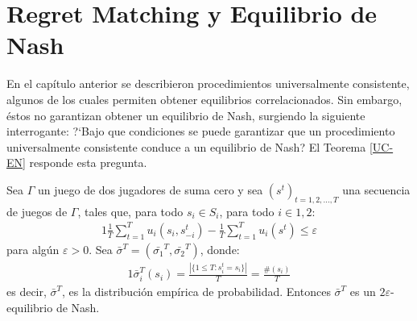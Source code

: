 \section{Regret Matching y Equilibrio de Nash}
En el capítulo anterior se describieron procedimientos universalmente consistente, algunos de los cuales permiten obtener equilibrios correlacionados. Sin embargo, éstos no garantizan obtener un equilibrio de Nash, surgiendo la siguiente interrogante: ?`Bajo que condiciones se puede garantizar que un procedimiento universalmente consistente conduce a un equilibrio de Nash? El Teorema \ref{UC-EN} responde esta pregunta.

\begin{theorem}
\label{UC-EN}
Sea $\Gamma$ un juego de dos jugadores de suma cero y sea $(s^t)_{t=1,2,..., T}$ una secuencia de juegos de $\Gamma$, tales que, para todo $s_i \in S_i$, para todo $i \in {1, 2}$:
\begin{alignat}{1}
\frac{1}{T}\sum_{t = 1}^{T}u_i(s_i, s_{-i}^t) - \frac{1}{T} \sum_{t = 1}^T u_i(s^t) \leq \varepsilon
\end{alignat}
para algún $\varepsilon > 0$. Sea $\bar{\sigma}^T = (\bar{\sigma_1}^T, \bar{\sigma_2}^T)$, donde:
\begin{alignat}{1}
\bar{\sigma}_i^T(s_i) = \frac{ |\{ 1 \leq T : s_i^t = s_i\}|}{T} = \frac{\#(s_i)}{T}
\end{alignat}
es decir, $\bar{\sigma}^T$, es la distribución empírica de probabilidad. Entonces $\bar{\sigma}^T$ es un $2\varepsilon$-equilibrio de Nash.
\end{theorem}

